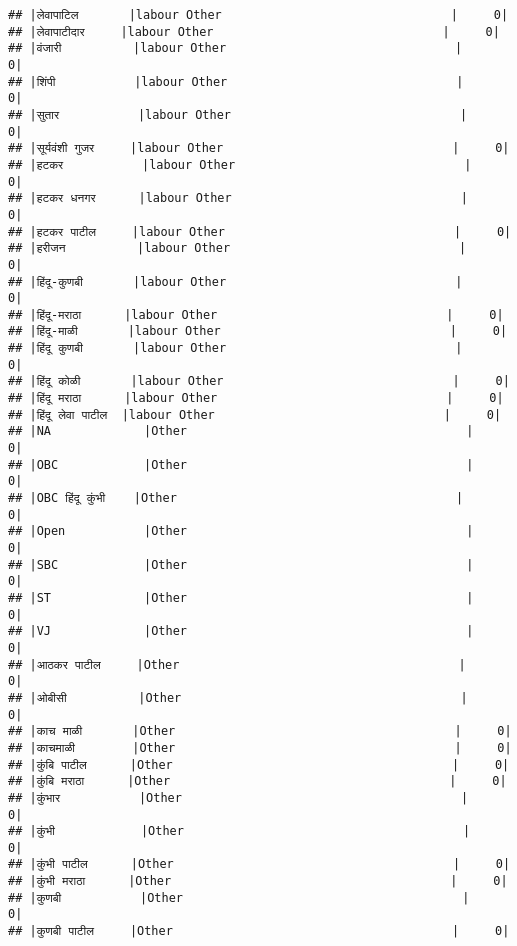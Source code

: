 \documentclass[
]{article}
\begin{document}
\begin{verbatim}
## |लेवापाटिल       |labour Other                                |     0|
## |लेवापाटीदार     |labour Other                                |     0|
## |वंजारी          |labour Other                                |     0|
## |शिंपी           |labour Other                                |     0|
## |सुतार           |labour Other                                |     0|
## |सूर्यवंशी गुजर     |labour Other                                |     0|
## |हटकर           |labour Other                                |     0|
## |हटकर धनगर      |labour Other                                |     0|
## |हटकर पाटील     |labour Other                                |     0|
## |हरीजन          |labour Other                                |     0|
## |हिंदू-कुणबी       |labour Other                                |     0|
## |हिंदू-मराठा      |labour Other                                |     0|
## |हिंदू-माळी       |labour Other                                |     0|
## |हिंदू कुणबी       |labour Other                                |     0|
## |हिंदू कोळी       |labour Other                                |     0|
## |हिंदू मराठा      |labour Other                                |     0|
## |हिंदू लेवा पाटील  |labour Other                                |     0|
## |NA             |Other                                       |     0|
## |OBC            |Other                                       |     0|
## |OBC हिंदू कुंभी    |Other                                       |     0|
## |Open           |Other                                       |     0|
## |SBC            |Other                                       |     0|
## |ST             |Other                                       |     0|
## |VJ             |Other                                       |     0|
## |आठकर पाटील     |Other                                       |     0|
## |ओबीसी          |Other                                       |     0|
## |काच माळी       |Other                                       |     0|
## |काचमाळी        |Other                                       |     0|
## |कुंबि पाटील      |Other                                       |     0|
## |कुंबि मराठा      |Other                                       |     0|
## |कुंभार           |Other                                       |     0|
## |कुंभी            |Other                                       |     0|
## |कुंभी पाटील      |Other                                       |     0|
## |कुंभी मराठा      |Other                                       |     0|
## |कुणबी           |Other                                       |     0|
## |कुणबी पाटील     |Other                                       |     0|

\end{verbatim}
\end{document}
